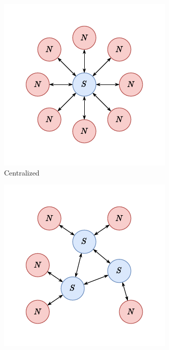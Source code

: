 \begin{figure}
  \centering
  \begin{subfigure}{.25\textwidth}
    \centering
    \includegraphics[width=\textwidth]{figures/topo-centralized}
    \caption{Centralized}
    \label{fig:bg.cids.centralized}
  \end{subfigure}%
  \begin{subfigure}{.25\textwidth}
    \centering
    \includegraphics[width=\textwidth]{figures/topo-decentralized}

\end{subfigure}
\end{figure}
